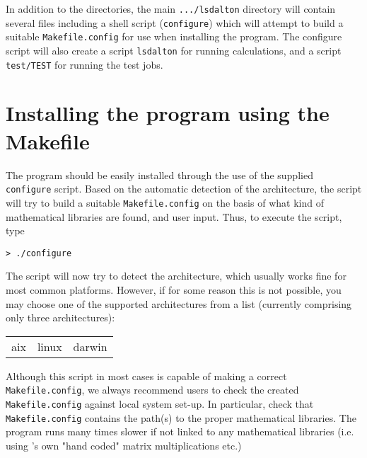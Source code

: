 In addition to the directories, the main \verb|.../lsdalton| directory will
contain several files including a shell script (\verb|configure|)
which will attempt to build a suitable \verb|Makefile.config| for use when
installing the program. The configure script will also create a
script \verb|lsdalton| for running calculations, and a script
\verb|test/TEST| for running the test jobs.

\section{Installing the program using the
Makefile}\label{sec:Makefile}

The program should be easily installed through the use of the supplied
\verb|configure| script. Based on the
automatic detection of the architecture, the
script will try to build a suitable
\verb|Makefile.config| on the
basis of what kind of mathematical libraries are found, and user
input. Thus, to execute the script, type
\begin{verbatim}
> ./configure 
\end{verbatim}

The script will now try to detect the architecture, which usually works fine
for most common platforms. However, if for some reason this is not possible, you
may choose one of the supported architectures from a list (currently comprising
only three architectures):

\bigskip

\begin{tabular}{lll}
aix \hspace{2cm} & linux \hspace{2cm}    & darwin\\
\end{tabular}

\bigskip

Although this script in most cases is capable of making a correct
\verb|Makefile.config|, we always recommend users to check the created
\verb|Makefile.config| against local system set-up. 
In particular, check that \verb|Makefile.config| contains the path(s)
to the proper mathematical libraries. The program runs many times slower
if not linked to any mathematical libraries (i.e. using {\lsdalton}'s own 
"hand coded" matrix multiplications etc.)

